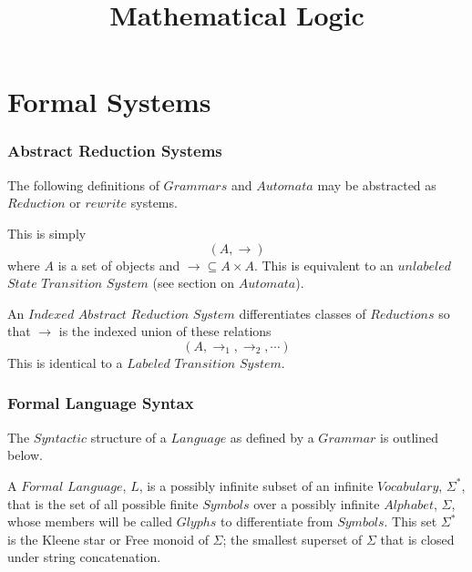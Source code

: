 \documentclass{article}
\begin{document}
\setcounter{secnumdepth}{5}
\setcounter{tocdepth}{5}


\title{Mathematical Logic}
\date{}
\maketitle


\tableofcontents

\part{Formal Systems}


\section{Abstract Reduction Systems}
The following definitions of $Grammars$ and $Automata$ may be
abstracted as $Reduction$ or $rewrite$ systems.

This is simply
    \[(A,\rightarrow)\]
where $A$ is a set of objects and $\rightarrow \subseteq A \times
A$. This is equivalent to an $unlabeled$ $State$ $Transition$ $System$
(see section on $Automata$).

An $Indexed$ $Abstract$ $Reduction$ $System$ differentiates classes of
$Reductions$ so that $\rightarrow$ is the indexed union of these
relations
    \[(A, \rightarrow_1, \rightarrow_2, \cdots)\]
This is identical to a $Labeled$ $Transition$ $System$.


\section{Formal Language Syntax}

The $Syntactic$ structure of a $Language$ as defined by a $Grammar$ is
outlined below.

A $Formal$ $Language$, $L$, is a possibly infinite subset of an
infinite $Vocabulary$, $\Sigma^*$, that is the set of all possible
finite $Symbols$ over a possibly infinite $Alphabet$, $\Sigma$, whose
members will be called $Glyphs$ to differentiate from $Symbols$. This
set $\Sigma^*$ is the Kleene star or Free monoid of $\Sigma$; the
smallest superset of $\Sigma$ that is closed under string
concatenation.
\end{document}
